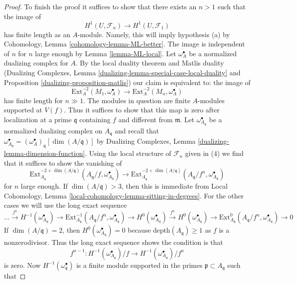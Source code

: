 \documentclass{stacks-project}
\theoremstyle{plain}
\theoremstyle{definition}
\theoremstyle{remark}
\numberwithin{equation}{subsection}
\begin{document}
\begin{proof}
\medskip\noindent
To finish the proof it suffices to show that there exists an $n > 1$
such that the image of
$$
H^1(U, \mathcal{F}_n) \longrightarrow H^1(U, \mathcal{F}_1)
$$
has finite length as an $A$-module. Namely, this will imply hypothesis (a)
by Cohomology, Lemma \ref{cohomology-lemma-ML-better}. The image is independent
of $n$ for $n$ large enough by Lemma \ref{lemma-ML-local}.
Let $\omega_A^\bullet$ be a normalized dualizing complex for $A$.
By the local duality theorem and Matlis duality
(Dualizing Complexes, Lemma \ref{dualizing-lemma-special-case-local-duality}
and Proposition \ref{dualizing-proposition-matlis})
our claim is equivalent to: the image of
$$
\text{Ext}^{-2}_A(M_1, \omega_A^\bullet) \to
\text{Ext}^{-2}_A(M_n, \omega_A^\bullet)
$$
has finite length for $n \gg 1$. The modules in question are
finite $A$-modules supported at $V(f)$. Thus it suffices to show that this
map is zero after localization at a prime $\mathfrak q$
containing $f$ and different from $\mathfrak m$.
Let $\omega_{A_\mathfrak q}^\bullet$ be a normalized
dualizing complex on $A_\mathfrak q$ and recall that
$\omega_{A_\mathfrak q}^\bullet =
(\omega_A^\bullet)_\mathfrak q[\dim(A/\mathfrak q)]$ by
Dualizing Complexes, Lemma \ref{dualizing-lemma-dimension-function}.
Using the local structure of $\mathcal{F}_n$ given in (4)
we find that it suffices to show the vanishing of
$$
\text{Ext}^{-2 + \dim(A/\mathfrak q)}_{A_\mathfrak q}(
A_\mathfrak q/f, \omega_{A_\mathfrak q}^\bullet)
\to
\text{Ext}^{-2 + \dim(A/\mathfrak q)}_{A_\mathfrak q}(
A_\mathfrak q/f^n, \omega_{A_\mathfrak q}^\bullet)
$$
for $n$ large enough. If $\dim(A/\mathfrak q) > 3$, then this is immediate from
Local Cohomology, Lemma \ref{local-cohomology-lemma-sitting-in-degrees}.
For the other cases we will use the long exact sequence
$$
\ldots
\xrightarrow{f^n}
H^{-1}(\omega_{A_\mathfrak q}^\bullet)
\to
\text{Ext}^{-1}_{A_\mathfrak q}(
A_\mathfrak q/f^n, \omega_{A_\mathfrak q}^\bullet) \to
H^0(\omega_{A_\mathfrak q}^\bullet)
\xrightarrow{f^n}
H^0(\omega_{A_\mathfrak q}^\bullet)
\to
\text{Ext}^0_{A_\mathfrak q}(
A_\mathfrak q/f^n, \omega_{A_\mathfrak q}^\bullet) \to 0
$$
If $\dim(A/\mathfrak q) = 2$, then
$H^0(\omega_{A_\mathfrak q}^\bullet) = 0$
because $\text{depth}(A_\mathfrak q) \geq 1$ as
$f$ is a nonzerodivisor.
Thus the long exact sequence shows the condition is that
$$
f^{n - 1} :
H^{-1}(\omega_{A_\mathfrak q}^\bullet)/f \to
H^{-1}(\omega_{A_\mathfrak q}^\bullet)/f^n
$$
is zero. Now $H^{-1}(\omega^\bullet_\mathfrak q)$ is a finite
module supported in the primes $\mathfrak p \subset A_\mathfrak q$ such that

\end{proof}
\end{document}
